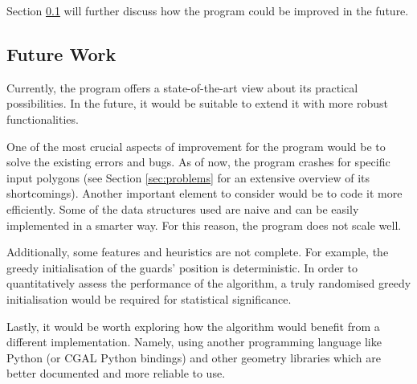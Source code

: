 Section \ref{sec:future} will further discuss how the program could be improved in the future.




\subsection{Future Work}
\label{sec:future}
Currently, the program offers a state-of-the-art view about its practical possibilities.
In the future, it would be suitable to extend it with more robust functionalities.

One of the most crucial aspects of improvement for the program would be to solve the existing errors and bugs. As of now, the program crashes for specific input polygons (see Section \ref{sec:problems} for an extensive overview of its shortcomings). Another important element to consider would be to code it more efficiently. Some of the data structures used are naive and can be easily implemented in a smarter way. For this reason, the program does not scale well. 

Additionally, some features and heuristics are not complete. For example, the greedy initialisation of the guards' position is deterministic. In order to quantitatively assess the performance of the algorithm, a truly randomised greedy initialisation would be required for statistical significance.

Lastly, it would be worth exploring how the algorithm would benefit from a different implementation. Namely, using another programming language like Python (or CGAL Python bindings) and other geometry libraries which are better documented and more reliable to use.
